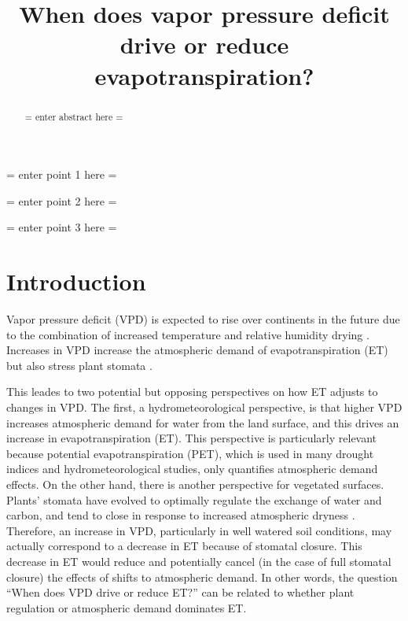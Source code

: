 \documentclass[draft,linenumbers]{agujournal}
\begin{document}
\title{When does vapor pressure deficit drive or reduce evapotranspiration?}





\begin{keypoints}
\item = enter point 1 here = 
\item = enter point 2 here = 
\item = enter point 3 here = 
\end{keypoints}


\begin{abstract}
= enter abstract here =
\end{abstract}

\section{Introduction}

Vapor pressure deficit (VPD) is expected to rise over continents in the future due to the combination of increased temperature and relative humidity drying \citep{Byrne_2013}. Increases in VPD increase the atmospheric demand of evapotranspiration (ET) \citep{Monteith_1965} but also stress plant stomata \citep{Leuning_1990, MEDLYN_2011}.

This leades to two potential but opposing perspectives on how ET adjusts to changes in VPD. The first, a hydrometeorological perspective, is that higher VPD increases atmospheric demand for water from the land surface, and this drives an increase in evapotranspiration (ET). This perspective is particularly relevant because potential evapotranspiration (PET), which is used in many drought indices and hydrometeorological studies, only quantifies atmospheric demand effects. On the other hand, there is another perspective for vegetated surfaces. Plants' stomata have evolved to optimally regulate the exchange of water and carbon, and tend to close in response to increased atmospheric dryness \citep{Ball_1987, Leuning_1990, MEDLYN_2011}.  Therefore, an increase in VPD, particularly in well watered soil conditions, may actually correspond to a decrease in ET because of stomatal closure. This decrease in ET would reduce and potentially cancel (in the case of full stomatal closure) the effects of shifts to atmospheric demand. In other words, the  question ``When does VPD drive or reduce ET?'' can be related to whether plant regulation or atmospheric demand dominates ET.
\end{document}
